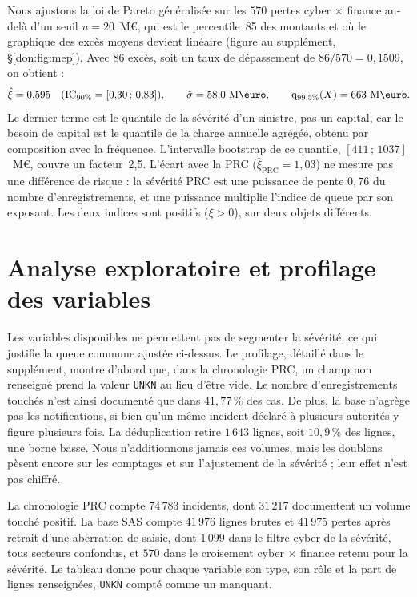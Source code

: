 Nous ajustons la loi de Pareto généralisée sur les $570$ pertes cyber $\times$ finance au-delà d'un
seuil $u = 20$~M\euro, qui est le percentile~85 des montants et où le graphique des excès moyens devient
linéaire (figure au supplément, \S\ref{don:fig:mep}). Avec $86$ excès, soit un taux de dépassement de $86/570 = 0{,}1509$, on obtient :
\[
\hat{\xi} = 0{,}595 \quad (\text{IC}_{90\%}=[0{,}30\,;\,0{,}83]), \qquad
\hat{\sigma} = 58{,}0~\text{M\euro}, \qquad
\qsev_{99{,}5\%}(X) = 663~\text{M\euro}.
\]
Le dernier terme est le quantile de la sévérité d'un sinistre, pas un capital, car le besoin de capital
est le quantile de la charge annuelle agrégée, obtenu par composition avec la fréquence. L'intervalle
bootstrap de ce quantile, $[411\,;\,1037]$~M\euro, couvre un facteur~2{,}5. L'écart avec la PRC
($\hat{\xi}_{\text{PRC}} = 1{,}03$) ne mesure pas une différence de risque : la sévérité PRC
est une puissance de pente $0{,}76$ du nombre d'enregistrements, et une puissance multiplie l'indice
de queue par son exposant. Les deux indices sont positifs ($\xi > 0$), sur deux objets différents.

\section{Analyse exploratoire et profilage des variables}
\label{sec:profilage-variables}

Les variables disponibles ne permettent pas de segmenter la sévérité, ce qui justifie la queue
commune ajustée ci-dessus. Le profilage, détaillé dans le supplément, montre d'abord que, dans la
chronologie PRC, un champ non renseigné prend la valeur \texttt{UNKN} au lieu d'être vide. Le nombre d'enregistrements touchés n'est ainsi documenté que dans $41{,}77\,\%$ des cas. De plus, la base n'agrège pas les
notifications, si bien qu'un même incident déclaré à plusieurs autorités y figure plusieurs fois. La
déduplication retire $1\,643$ lignes, soit $10{,}9\,\%$ des lignes, une borne basse. Nous n'additionnons jamais ces volumes, mais les doublons pèsent encore sur les comptages et sur l'ajustement de la sévérité ; leur effet n'est pas chiffré.

La chronologie PRC compte $74\,783$ incidents, dont $31\,217$ documentent un volume touché
positif. La base SAS compte $41\,976$ lignes brutes et $41\,975$ pertes après retrait d'une
aberration de saisie, dont $1\,099$ dans le filtre cyber de la sévérité, tous secteurs confondus, et $570$ dans le croisement cyber $\times$
finance retenu pour la sévérité. Le tableau donne pour chaque variable son type, son rôle et la part
de lignes renseignées, \texttt{UNKN} compté comme un manquant.

